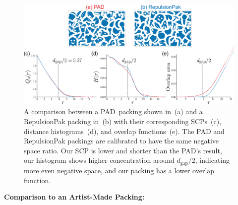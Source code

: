 \begin{figure}[t]
\centering
\includegraphics[width=1.0\textwidth]{figures/metrics/pad_comparison.pdf}
\caption[A comparison between a PAD~packing and a RepulsionPak packing \newline  with their corresponding SCPs]
{\label{pad_comparison}
    A comparison between a PAD~packing shown in~(a) and a RepulsionPak packing in~(b) 
    with their corresponding SCPs~(c), distance histograms~(d), and overlap functions~(e). 
  The PAD and RepulsionPak packings are calibrated
  to have the same negative space ratio.
    Our SCP is lower and shorter than the PAD's result,
    our histogram shows higher concentration around $d_\mathrm{gap} / 2$,
    indicating more even negative space,
    and our packing has a lower overlap function.
}
\end{figure}

\textbf{Comparison to an Artist-Made Packing:} 

